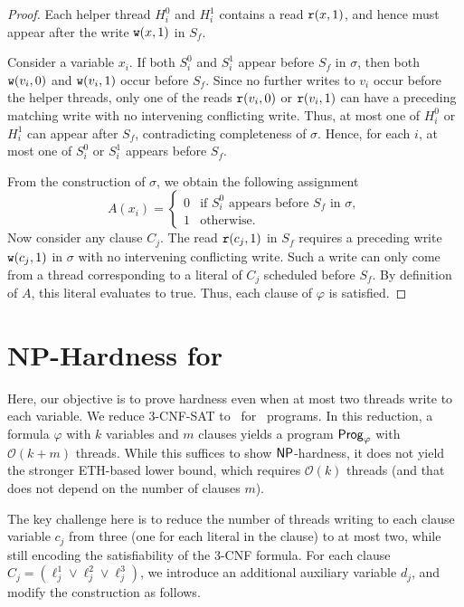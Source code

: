 \begin{proof}
    Each helper thread $H_i^0$ and $H_i^1$ contains a read $\mathtt{r}(x,1)$, and hence must appear after the write $\mathtt{w}(x,1)$ in $S_f$.

    Consider a variable $x_i$. If both $S_i^0$ and $S_i^1$ appear before $S_f$ in $\sigma$, then both $\mathtt{w}(v_i,0)$ and $\mathtt{w}(v_i,1)$ occur before $S_f$. Since no further writes to $v_i$ occur before the helper threads, only one of the reads $\mathtt{r}(v_i,0)$ or $\mathtt{r}(v_i,1)$ can have a preceding matching write with no intervening conflicting write. Thus, at most one of $H_i^0$ or $H_i^1$ can appear after $S_f$, contradicting completeness of $\sigma$. Hence, for each $i$, at most one of $S_i^0$ or $S_i^1$ appears before $S_f$.

From the construction of $\sigma$, we obtain the following assignment
\[
A(x_i) =
\begin{cases}
0 & \text{if } S_i^0 \text{ appears before } S_f \text{ in } \sigma,\\
1 & \text{otherwise.}
\end{cases}
\]
Now consider any clause $C_j$. The read $\mathtt{r}(c_j,1)$ in $S_f$ requires a preceding write $\mathtt{w}(c_j,1)$ in $\sigma$ with no intervening conflicting write. Such a write can only come from a thread corresponding to a literal of $C_j$ scheduled before $S_f$. By definition of $A$, this literal evaluates to true. Thus, each clause of $\varphi$ is satisfied.
\end{proof}



\section{NP-Hardness for \twowriter}\label{sec:np}

Here, our objective is to prove hardness even when at most two threads write to each variable. We reduce 3-CNF-SAT to \vscp\ for \twowriter\ programs. In this reduction, a formula $\varphi$ with $k$ variables and $m$ clauses yields a program $\mathsf{Prog}_\varphi$ with $\mathcal{O}(k+m)$ threads. While this suffices to show $\mathsf{NP}$-hardness, it does not yield the stronger ETH-based lower bound, which requires $\mathcal{O}(k)$ threads (and that does not depend on the number of clauses $m$).


The key challenge here is to reduce the number of threads writing to each clause variable $c_j$ from three (one for each literal in the clause) to at most two, while still encoding the satisfiability of the 3-CNF formula.
For each clause $C_j = (\ell_j^1 \vee \ell_j^2 \vee \ell_j^3)$, we introduce an additional auxiliary variable $d_j$, and modify the construction as follows.

